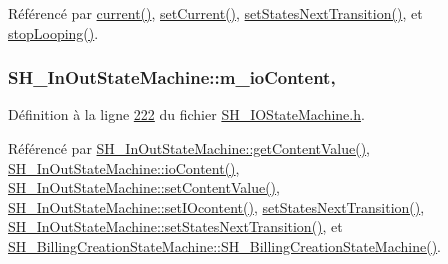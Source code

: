 Référencé par \hyperlink{classSH__LoopingInOutStateMachine_afce58401195a4941b1939c46f1caa23b}{current()}, \hyperlink{classSH__LoopingInOutStateMachine_aed2f3a75029856cbf28cae78040e17c1}{set\-Current()}, \hyperlink{classSH__LoopingInOutStateMachine_a0ee122553641721012f3710e71cce234}{set\-States\-Next\-Transition()}, et \hyperlink{classSH__LoopingInOutStateMachine_a73d75e30318da22fec99387e9bf02a9b}{stop\-Looping()}.

\hypertarget{classSH__InOutStateMachine_a8cfbc27eef057bf37b7711bdfef2077e}{
\subsubsection[{m\-\_\-io\-Content}]{\setlength{\rightskip}{0pt plus 5cm}S\-H\-\_\-\-In\-Out\-State\-Machine\-::m\-\_\-io\-Content\hspace{0.3cm}{\ttfamily [protected]}, {\ttfamily [inherited]}}}\label{classSH__InOutStateMachine_a8cfbc27eef057bf37b7711bdfef2077e}


Définition à la ligne \hyperlink{SH__IOStateMachine_8h_source_l00222}{222} du fichier \hyperlink{SH__IOStateMachine_8h_source}{S\-H\-\_\-\-I\-O\-State\-Machine.\-h}.



Référencé par \hyperlink{classSH__InOutStateMachine_aa1a3bd3c0ea8a59b9bc916dc718eb9ca}{S\-H\-\_\-\-In\-Out\-State\-Machine\-::get\-Content\-Value()}, \hyperlink{classSH__InOutStateMachine_aaca105fbd5f5cc3bac115389ad3694c5}{S\-H\-\_\-\-In\-Out\-State\-Machine\-::io\-Content()}, \hyperlink{classSH__InOutStateMachine_a9ab1534306b2bdb62743d4bcefe40c17}{S\-H\-\_\-\-In\-Out\-State\-Machine\-::set\-Content\-Value()}, \hyperlink{classSH__InOutStateMachine_a8271a7ec7d5f6502449dd3b4da5f4155}{S\-H\-\_\-\-In\-Out\-State\-Machine\-::set\-I\-Ocontent()}, \hyperlink{classSH__LoopingInOutStateMachine_a0ee122553641721012f3710e71cce234}{set\-States\-Next\-Transition()}, \hyperlink{classSH__InOutStateMachine_a70d6d81c0a8d4afd6aab0a7239edc237}{S\-H\-\_\-\-In\-Out\-State\-Machine\-::set\-States\-Next\-Transition()}, et \hyperlink{classSH__BillingCreationStateMachine_ad62b77fa4aeafe200056ff3974562f83}{S\-H\-\_\-\-Billing\-Creation\-State\-Machine\-::\-S\-H\-\_\-\-Billing\-Creation\-State\-Machine()}.

